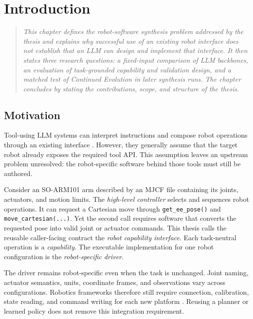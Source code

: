 \chapter[Introduction]{Introduction}\label{chapter:introduction}

\begin{quote}\itshape
This chapter defines the robot-software synthesis problem addressed by the
thesis and explains why successful use of an existing robot interface does not
establish that an LLM can design and implement that interface. It then states
three research questions: a fixed-input comparison of LLM backbones, an
evaluation of task-grounded capability and validation design, and a matched
test of Continued Evolution in later synthesis runs. The chapter concludes by
stating the contributions, scope, and structure of the thesis.
\end{quote}

\section[Motivation]{Motivation}
\label{sec:intro-motivation}

Tool-using LLM systems can interpret instructions and compose robot operations
through an existing interface
\citep{ahn2022saycan,liang2023codeaspolicies}. However, they generally assume
that the target robot already exposes the required tool API. This assumption
leaves an upstream problem unresolved: the robot-specific software behind
those tools must still be authored.

Consider an SO-ARM101 arm described by an MJCF file containing its joints,
actuators, and motion limits. The \emph{high-level controller} selects and
sequences robot operations. It can request a Cartesian move through
\texttt{get\_ee\_pose()} and \texttt{move\_cartesian(...)}. Yet the second call
requires software that converts the requested pose into valid joint or actuator
commands. This thesis calls the reusable caller-facing contract the
\emph{robot capability interface}. Each task-neutral operation is a
\emph{capability}. The executable implementation for one robot configuration
is the \emph{robot-specific driver}.

The driver remains robot-specific even when the task is unchanged. Joint
naming, actuator semantics, units, coordinate frames, and observations vary
across configurations. Robotics frameworks therefore still require connection,
calibration, state reading, and command writing for each new platform
\citep{lerobot2026hardware,ros2control2026hardware}. Reusing a planner or learned
policy does not remove this integration requirement.

